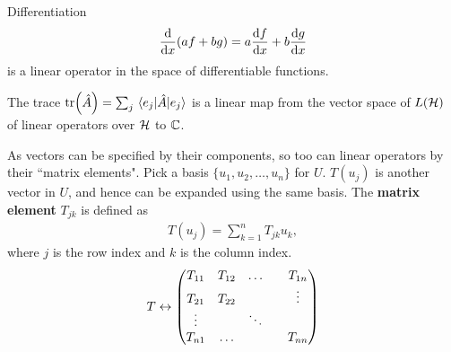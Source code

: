 \begin{example}
	Differentiation
	\begin{align}
		\dv{x}(af+bg) = a\dv{f}{x} + b\dv{g}{x}
	\end{align}
	is a linear operator in the space of differentiable functions.
\end{example}

\begin{example}
	The trace $\tr(\hat A) = \sum_j \expval{\hat A}{e_j}$ is a linear map from the vector space of $L(\mathcal{H})$ of linear operators over $\mathcal{H}$ to $\mathbb C$.
\end{example}
\begin{comment}
\begin{example}[\bf Quantum information example]\leavevmode
	The partial trace 
	\begin{align}
		\tr_B: L(\hilb_A) \otimes L(\hilb_B)&\mapsto L(\hilb_A) \\
		\tr_B(\op\rho_{AB}) &= \sum_j {}_B\expval{\op \rho_{AB}}{e_j}_B
	\end{align}
\end{example}
\end{comment}

As vectors can be specified by their components, so too can linear operators by their ``matrix elements".
Pick a basis $\{u_1,u_2,\dots,u_n\}$ for $U$. $T(u_j)$ is another vector in $U$, and hence can be expanded using the same basis. The {\bf matrix element} $T_{jk}$ is defined as
\begin{align}
	T(u_j) = \sum_{k=1}^n  T_{jk} u_k,
\end{align}
where $j$ is the row index and $k$ is the column index.
\begin{align}
	T \leftrightarrow \mqty(T_{11}&T_{12}& \dots & & T_{1n} \\ T_{21}& T_{22} & & & \vdots \\ \vdots & & \ddots & & \\ T_{n1} & \dots & & & T_{nn}) 
\end{align}

